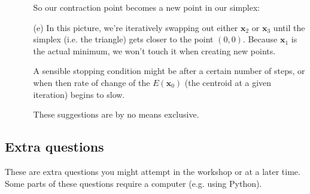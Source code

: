 \documentclass[11pt,a4paper]{scrartcl}
\begin{document}
\begin{enumerate}
\begin{enumerate}
So our contraction point becomes a new point in our simplex:


    \item[(e)] In this picture, we're iteratively swapping out either $\mathbf{x}_2$ or $\mathbf{x}_3$ until the simplex (i.e. the triangle) gets closer to the point $(0,0)$. Because $\mathbf{x}_1$ is the actual minimum, we won't touch it when creating new points. 

    A sensible stopping condition might be after a certain number of steps, or when then rate of change of the $E(\mathbf{x}_0)$ (the centroid at a given iteration) begins to slow.  

    These suggestions are by no means exclusive. 
    
\end{enumerate}
\end{enumerate}

\subsection*{Extra questions}

These are extra questions you might attempt in the workshop or at a later time. Some parts of these questions require a computer (e.g. using Python).
\end{document}
